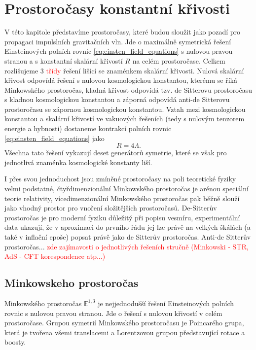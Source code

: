 \chapter{Prostoročasy konstantní křivosti}
\label{chap:kap01}
V této kapitole představíme prostoročasy, které budou sloužit jako pozadí pro propagaci impulslních gravitačních vln. Jde o maximálně
symetrická řešení Einsteinových polních rovnic \eqref{eq:einsten_field_equations} s nulovou pravou stranou a s konstantní skalární křivostí $R$ na celém prostoročase.
Celkem rozlišujeme 3 \textcolor{red}{třídy} řešení lišící se znaménkem skalární křivosti. Nulová skalární křivost odpovídá řešení s nulovou
kosmologickou konstantou, kterému se říká Minkowského prostoročas, kladná křivost odpovídá tzv. de Sitterovu prostoročasu s kladnou kosmologickou
konstantou a záporná odpovídá anti-de Sitterovu prostoročasu se zápornou kosmologickou konstantou. Vztah mezi kosmologickou konstantou a skalární
křivostí ve vakuových řešeních (tedy s nulovým tenzorem energie a hybnosti) dostaneme kontrakcí polních rovnic \eqref{eq:einsten_field_equations} jako
\begin{equation}
     R = 4 \Lambda.
\end{equation}
Všechna tato řešení vykazují deset generátorů symetrie, které se však pro jednotlivá znaménka kosmologické konstanty liší.

I přes svou jednoduchost jsou zmíněné prostoročasy na poli teoretické fyziky velmi podstatné, čtyřdimenzionální Minkowského prostoročas je arénou speciální
teorie relativity, vícedimenzionální Minkowského prostoročas pak běžně slouží jako vhodný prostor pro vnoření složitějších prostoročasů.
De-Sitterův prostoročas je pro moderní fyziku důležitý při popisu vesmíru, experimentální data
ukazují, že v aproximaci do prvního řádu jej lze právě na velkých škálách (a také v inflační epoše) popsat právě jako de Sitterův prostoročas.
Anti-de Sitterův prostoročas... \cite{Bicak:2000ea} \textcolor{red}{zde zajímavosti
o jednotlivých řešeních stručně (Minkowski - STR, AdS - CFT korespondence atp...)}


\section{Minkowskeho prostoročas}
Minkowského prostoročas $\mathbb{E}^{1,3}$ je nejjednodušší řešení Einsteinových polních rovnic s nulovou pravou stranou.
Jde o řešení s nulovou křivostí v celém prostoročase. Grupou symetrií Minkowského prostoročasu je Poincarého
grupa, která je tvořena všemi translacemi a Lorentzovou grupou představující rotace a boosty.

